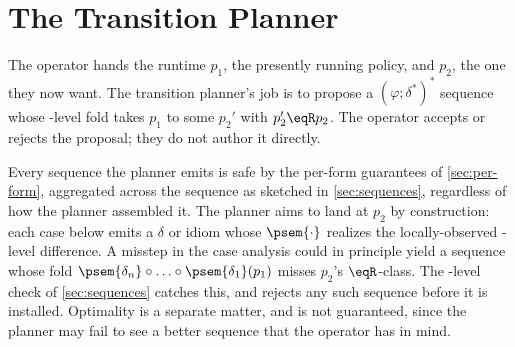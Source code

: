 
\section{The Transition Planner}\label{sec:planner}


The operator hands the runtime \(p_1\), the presently running policy, and \(p_2\), the one they now want.
The transition planner's job is to propose a \((\varphi ; \delta^{*})^{*}\) sequence whose \pol-level fold takes \(p_1\) to some \(p_2'\) with \(p_2' \eqR p_2\).
The operator accepts or rejects the proposal; they do not author it directly.

Every sequence the planner emits is safe by the per-form guarantees of \cref{sec:per-form}, aggregated across the sequence as sketched in \cref{sec:sequences}, regardless of how the planner assembled it.
The planner aims to land at \(p_2\) by construction: each case below emits a \(\delta\) or idiom whose \(\psem{\cdot}\) realizes the locally-observed \pol-level difference.
A misstep in the case analysis could in principle yield a sequence whose fold \(\psem{\delta_n} \circ \ldots \circ \psem{\delta_1} (p_1)\) misses \(p_2\)'s \(\eqR\)-class.
The \pol-level check of \cref{sec:sequences} catches this, and rejects any such sequence before it is installed.
Optimality is a separate matter, and is not guaranteed, since the planner may fail to see a better sequence that the operator has in mind.

